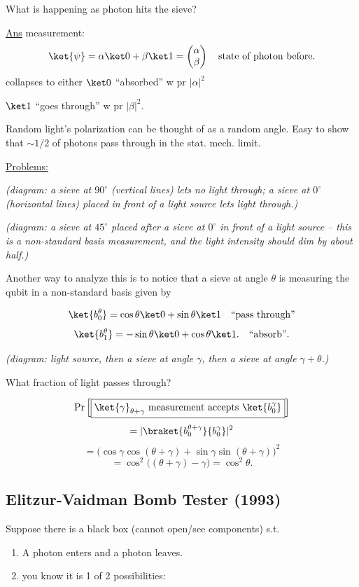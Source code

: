 \documentclass[11pt]{article}
\begin{document}
What is happening as photon hits the sieve?

\underline{Ans} measurement:
\[
\ket{\psi} = \alpha\ket0+\beta\ket1 = \begin{pmatrix}\alpha\\\beta\end{pmatrix} \quad \text{state of photon before.}
\]
collapses to either $\ket0$ ``absorbed'' w pr $|\alpha|^2$

\hspace{2.7cm} $\ket1$ ``goes through'' w pr $|\beta|^2$.

Random light's polarization can be thought of as a random angle. Easy to show that $\sim 1/2$ of photons pass through in the stat. mech. limit.

\underline{Problems:}

\emph{(diagram: a sieve at $90^\circ$ (vertical lines) lets no light through; a sieve at $0^\circ$ (horizontal lines) placed in front of a light source lets light through.)}

\emph{(diagram: a sieve at $45^\circ$ placed after a sieve at $0^\circ$ in front of a light source -- this is a non-standard basis measurement, and the light intensity should dim by about half.)}

Another way to analyze this is to notice that a sieve at angle $\theta$ is measuring the qubit in a non-standard basis given by

\[
\ket{b_0^\theta} = \cos\theta\ket0 + \sin\theta\ket1 \quad \text{``pass through''}
\]
\[
\ket{b_1^\theta} = -\sin\theta\ket0 + \cos\theta\ket1. \quad \text{``absorb''}.
\]

\emph{(diagram: light source, then a sieve at angle $\gamma$, then a sieve at angle $\gamma+\theta$.)}

What fraction of light passes through?

\[
\Pr\Big[\boxed{\ket{\gamma}_{\theta+\gamma} \text{ measurement accepts } \ket{b_0^\gamma}}\Big]
\]
\[
= |\braket{b_0^{\theta+\gamma}}{b_0^\gamma}|^2
\]
\[
= \big(\cos\gamma\cos(\theta+\gamma) + \sin\gamma\sin(\theta+\gamma)\big)^2
\]
\[
= \cos^2\big((\theta+\gamma)-\gamma\big) = \boxed{\cos^2\theta}.
\]

\subsection*{Elitzur-Vaidman Bomb Tester (1993)}

Suppose there is a black box (cannot open/see components) s.t.
\begin{enumerate}
    \item[(a)] A photon enters and a photon leaves.
    \item[(b)] you know it is 1 of 2 possibilities:
\end{enumerate}
\end{document}

